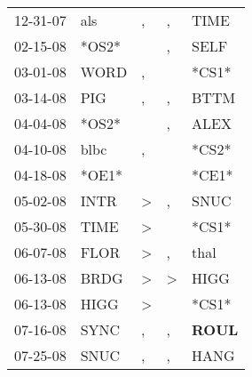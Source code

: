 \begin{supertabular}{p{0.07\textwidth}p{0.06\textwidth}p{0.02\textwidth}p{0.02\textwidth}p{0.06\textwidth}}
          12-31-07\textsuperscript{} &            als\textsuperscript{} &                , &                , &           TIME\textsuperscript{} \\
          02-15-08\textsuperscript{} &                            *OS2* &                  &                , &           SELF\textsuperscript{} \\
          03-01-08\textsuperscript{} &           WORD\textsuperscript{} &                , &                  &                            *CS1* \\
          03-14-08\textsuperscript{} &            PIG\textsuperscript{} &                , &                , &           BTTM\textsuperscript{} \\
          04-04-08\textsuperscript{} &                            *OS2* &                  &                , &           ALEX\textsuperscript{} \\
          04-10-08\textsuperscript{} &           blbc\textsuperscript{} &                , &                  &                            *CS2* \\
          04-18-08\textsuperscript{} &                            *OE1* &                  &                  &                            *CE1* \\
          05-02-08\textsuperscript{} &           INTR\textsuperscript{} &     \textgreater &                , &           SNUC\textsuperscript{} \\
          05-30-08\textsuperscript{} &           TIME\textsuperscript{} &     \textgreater &                  &                            *CS1* \\
          06-07-08\textsuperscript{} &           FLOR\textsuperscript{} &     \textgreater &                , &           thal\textsuperscript{} \\
          06-13-08\textsuperscript{} &           BRDG\textsuperscript{} &     \textgreater &     \textgreater &           HIGG\textsuperscript{} \\
          06-13-08\textsuperscript{} &           HIGG\textsuperscript{} &     \textgreater &                  &                            *CS1* \\
          07-16-08\textsuperscript{} &           SYNC\textsuperscript{} &                , &                , &  \textbf{ROUL\textsuperscript{}} \\
          07-25-08\textsuperscript{} &           SNUC\textsuperscript{} &                , &                , &           HANG\textsuperscript{} \\

\end{supertabular}
